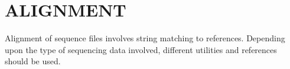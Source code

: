 \section{ALIGNMENT}
Alignment of sequence files involves string matching to references. Depending upon the type of sequencing data involved, different utilities and references should be used.


